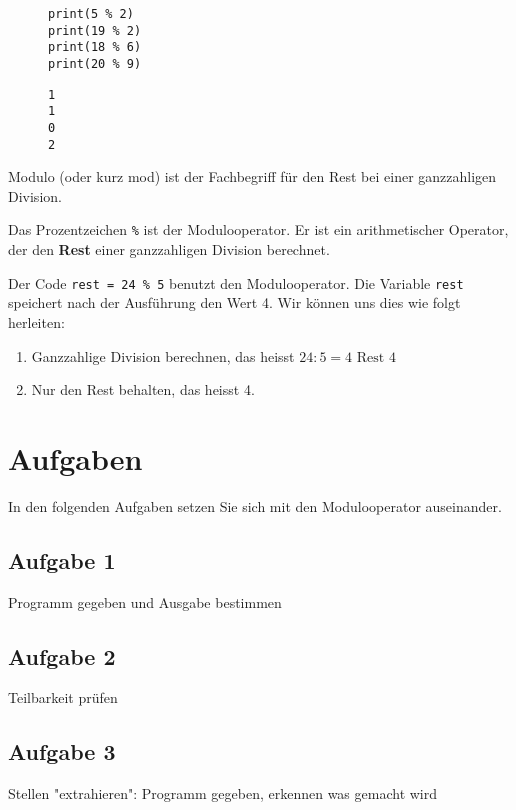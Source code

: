 \begin{figure}[htb]
\begin{minipage}{0.45\textwidth}
\begin{lstlisting}[label={lst-modulo-example}, caption={Das Prozentzeichen ist der Modoluooperator.}]
print(5 % 2)
print(19 % 2)
print(18 % 6)
print(20 % 9)
\end{lstlisting}
\end{minipage}
\hfill
\begin{minipage}{0.45\textwidth}
\begin{lstlisting}[language=output, label={lst-modulo-example-output}, caption={Reste der ganzzahligen Divisionen.}]
1
1
0
2
\end{lstlisting}
\end{minipage}
\end{figure}

Modulo (oder kurz mod) ist der Fachbegriff für den Rest bei einer ganzzahligen Division.

\begin{definition}[Modulooperator]
Das Prozentzeichen \lstinline{%}
ist der Modulooperator. Er ist ein arithmetischer Operator, der den \textbf{Rest} einer ganzzahligen Division berechnet.
\end{definition}

\begin{example}
Der Code \lstinline{rest = 24 % 5} 
benutzt den Modulooperator. Die Variable \lstinline{rest} speichert nach der Ausführung den Wert \num{4}. Wir können uns dies wie folgt herleiten:
\begin{enumerate}
\item Ganzzahlige Division berechnen, das heisst $24 : 5 = 4 \text{ Rest } 4$
\item Nur den Rest behalten, das heisst \num{4}.
\end{enumerate}
\end{example}

\section{Aufgaben}

In den folgenden Aufgaben setzen Sie sich mit den Modulooperator auseinander.

\subsection{Aufgabe 1}

Programm gegeben und Ausgabe bestimmen

\subsection{Aufgabe 2}

Teilbarkeit prüfen

\subsection{Aufgabe 3}

Stellen "extrahieren": Programm gegeben, erkennen was gemacht wird